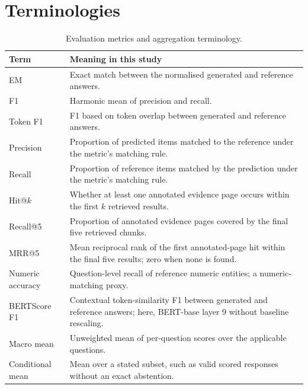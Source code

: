 
\section{Terminologies}
\fontsize{11}{13}\selectfont

\begin{table}[H]
\centering
\caption{Evaluation metrics and aggregation terminology.}
\label{tab:evaluation-terminology}
{\small
\renewcommand{\arraystretch}{1.08}
\begin{tabular}{|p{}|p{}|}
\hline
\textbf{Term} & \textbf{Meaning in this study} \\
\hline
EM & Exact match between the normalised generated and reference answers. \\
F1 & Harmonic mean of precision and recall. \\
Token F1 & F1 based on token overlap between generated and reference answers. \\
Precision & Proportion of predicted items matched to the reference under the metric's matching rule. \\
Recall & Proportion of reference items matched by the prediction under the metric's matching rule. \\
Hit@$k$ & Whether at least one annotated evidence page occurs within the first $k$ retrieved results. \\
Recall@5 & Proportion of annotated evidence pages covered by the final five retrieved chunks. \\
MRR@5 & Mean reciprocal rank of the first annotated-page hit within the final five results; zero when none is found. \\
Numeric accuracy & Question-level recall of reference numeric entities; a numeric-matching proxy. \\
BERTScore F1 & Contextual token-similarity F1 between generated and reference answers; here, BERT-base layer 9 without baseline rescaling. \\
Macro mean & Unweighted mean of per-question scores over the applicable questions. \\
Conditional mean & Mean over a stated subset, such as valid scored responses without an exact abstention. \\
\hline
\end{tabular}%
}
\end{table}

